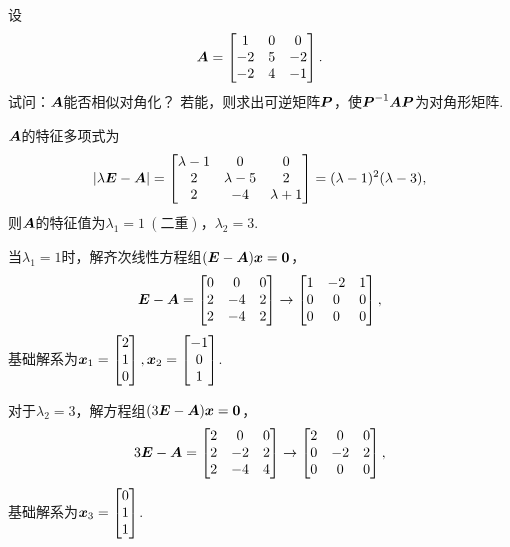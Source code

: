\begin{example}
设\[
	\boldsymbol{A} = \begin{bmatrix}
		1 & 0 & 0 \\
		-2 & 5 & -2 \\
		-2 & 4 & -1
	\end{bmatrix}.
\]
试问：\(\boldsymbol{A}\)能否相似对角化？
若能，则求出可逆矩阵\(\boldsymbol{P}\)，使\(\boldsymbol{P}^{-1}\boldsymbol{A}\boldsymbol{P}\)为对角形矩阵.
\begin{solution}
\(\boldsymbol{A}\)的特征多项式为\[
	\abs{\lambda\boldsymbol{E}-\boldsymbol{A}} = \begin{bmatrix}
		\lambda-1 & 0 & 0 \\
		2 & \lambda-5 & 2 \\
		2 & -4 & \lambda+1
	\end{bmatrix}
	= (\lambda-1)^2 (\lambda-3),
\]
则\(\boldsymbol{A}\)的特征值为\(\lambda_1=1\ (\text{二重})\)，\(\lambda_2=3\).

当\(\lambda_1=1\)时，解齐次线性方程组\((\boldsymbol{E}-\boldsymbol{A})\boldsymbol{x}=\boldsymbol0\)，\[
	\boldsymbol{E}-\boldsymbol{A}=\begin{bmatrix}
		0 & 0 & 0 \\
		2 & -4 & 2 \\
		2 & -4 & 2
	\end{bmatrix}
	\to \begin{bmatrix}
		1 & -2 & 1 \\
		0 & 0 & 0 \\
		0 & 0 & 0
	\end{bmatrix},
\]
基础解系为\(\boldsymbol{x}_1 = \begin{bmatrix} 2 \\ 1 \\ 0 \end{bmatrix},
\boldsymbol{x}_2 = \begin{bmatrix} -1 \\ 0 \\ 1 \end{bmatrix}\).

对于\(\lambda_2=3\)，解方程组\((3\boldsymbol{E}-\boldsymbol{A})\boldsymbol{x}=\boldsymbol0\)，\[
	3\boldsymbol{E}-\boldsymbol{A}=\begin{bmatrix}
		2 & 0 & 0 \\
		2 & -2 & 2 \\
		2 & -4 & 4
	\end{bmatrix} \to \begin{bmatrix}
		2 & 0 & 0 \\
		0 & -2 & 2 \\
		0 & 0 & 0
	\end{bmatrix},
\]
基础解系为\(\boldsymbol{x}_3 = \begin{bmatrix} 0 \\ 1 \\ 1 \end{bmatrix}\).


\end{solution}
\end{example}
